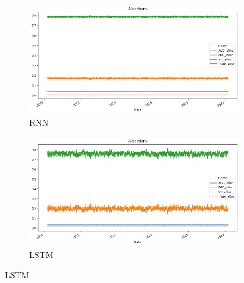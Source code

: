 \documentclass[11pt]{article}
\begin{document}
\begin{figure}[h]
    \centering

    \begin{subfigure}[b]{0.45\textwidth}
        \centering
        \includegraphics[width=\textwidth]{images/allocations_rnn_synthetic.png}
        \caption{RNN}
    \end{subfigure}
    \hfill
    \begin{subfigure}[b]{0.45\textwidth}
        \centering
        \includegraphics[width=\textwidth]{images/allocations_lstm_synthetic.png}
        \caption{LSTM}
    \end{subfigure}


\end{figure}
\end{document}
